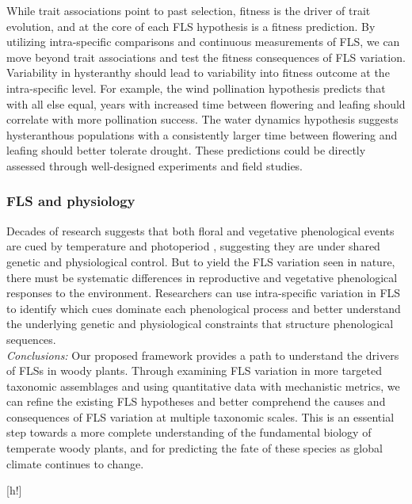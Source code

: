 \documentclass{article}
\begin{document}
{\noindent While trait associations point to past selection, fitness is the driver of trait evolution, and at the core of each FLS hypothesis is a fitness prediction. By utilizing intra-specific comparisons and continuous measurements of FLS, we can move beyond trait associations and test the fitness consequences of FLS variation. Variability in hysteranthy should lead to variability into fitness outcome at the intra-specific level. For example, the wind pollination hypothesis predicts that with all else equal, years with increased time between flowering and leafing should correlate with more pollination success. The water dynamics hypothesis suggests hysteranthous populations with a consistently larger time between flowering and leafing should better tolerate drought. These predictions could be directly assessed through well-designed experiments and field studies.\\

\subsubsection*{FLS and physiology} 
Decades of research suggests that both floral and vegetative phenological events are cued by temperature and photoperiod \citep{Forrest2010, Flynn2018}, suggesting they are under shared genetic and physiological control. But to yield the FLS variation seen in nature, there must be systematic differences in reproductive and vegetative phenological responses to the environment. Researchers can use intra-specific variation in FLS to identify which cues dominate each phenological process and better understand the underlying genetic and physiological constraints that structure phenological sequences.\\

\emph{Conclusions:} Our proposed framework provides a path to understand the drivers of FLSs in woody plants. Through examining FLS variation in more targeted taxonomic assemblages and using quantitative data with mechanistic metrics, we can refine the existing FLS hypotheses and better comprehend the causes and consequences of FLS variation at multiple taxonomic scales. This is an essential step towards a more complete understanding of the fundamental biology of temperate woody plants, and for predicting the fate of these species as global climate continues to change.

[h!]
 
\pagebreak

}
\end{document}
